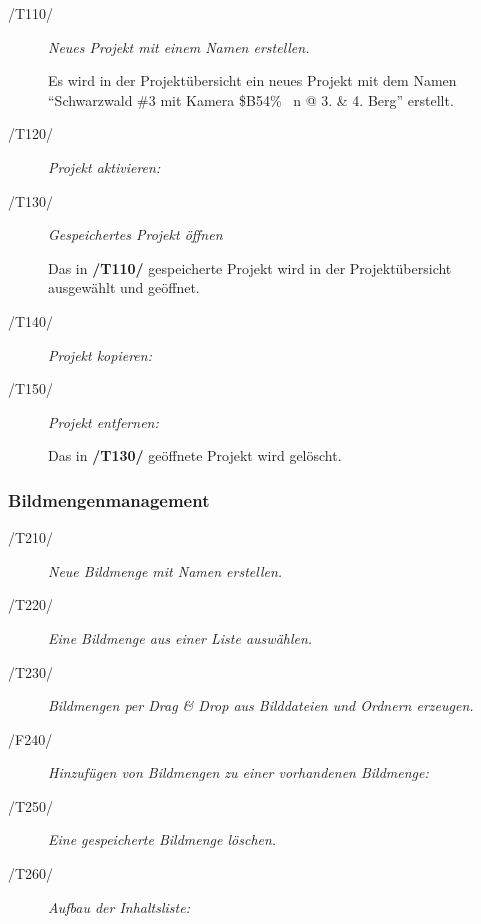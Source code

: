 		\begin{description}
		
			\item[/T110/] \textit{Neues Projekt mit einem Namen erstellen.}\par Es wird in der Projektübersicht ein neues Projekt mit dem Namen "`Schwarzwald \#3 mit Kamera \$B54\% ~n @ 3. \& 4. Berg"' erstellt.
				
			\item[/T120/] \textit{Projekt aktivieren:}\par 
				
			\item[/T130/] \textit{Gespeichertes Projekt öffnen}\par Das in \textbf{/T110/} gespeicherte Projekt wird in der Projektübersicht ausgewählt und geöffnet.
			\item[/T140/] \textit{Projekt kopieren:}\par 
				
			\item[/T150/] \textit{Projekt entfernen:}\par Das in \textbf{/T130/} geöffnete Projekt wird gelöscht.
		
		\end{description}
	
	\subsubsection{Bildmengenmanagement}
		
		\begin{description}
		
			\item[/T210/] \textit{Neue Bildmenge mit Namen erstellen.}\par
				
			\item[/T220/] \textit{Eine Bildmenge aus einer Liste auswählen.}\par

			\item[/T230/] \textit{Bildmengen per Drag \& Drop aus Bilddateien und Ordnern erzeugen.}\par
			
			\item[/F240/] \textit{Hinzufügen von Bildmengen zu einer vorhandenen Bildmenge:}\par
				
			\item[/T250/] \textit{Eine gespeicherte Bildmenge löschen.}\par
			
			\item[/T260/] \textit{Aufbau der Inhaltsliste:}\par 	
		
		\end{description}
	
